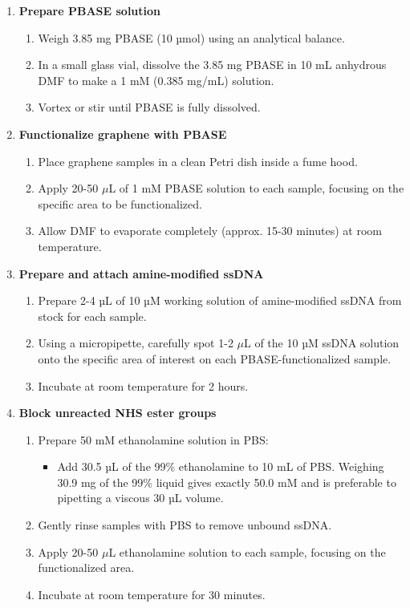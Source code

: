 \documentclass[11pt]{article}
\begin{document}
\begin{enumerate}
    \item \textbf{Prepare PBASE solution}
    \begin{enumerate}[label=(\alph*)]
        \item Weigh 3.85 mg PBASE (10 µmol) using an analytical balance.
        \item In a small glass vial, dissolve the 3.85 mg PBASE in 10 mL anhydrous DMF to make a 1 mM (0.385 mg/mL) solution.
        \item Vortex or stir until PBASE is fully dissolved.
    \end{enumerate}

    \item \textbf{Functionalize graphene with PBASE}
    \begin{enumerate}[label=(\alph*)]
        \item Place graphene samples in a clean Petri dish inside a fume hood.
        \item Apply 20-50 $\mu$L of 1 mM PBASE solution to each sample, focusing on the specific area to be functionalized.
        \item Allow DMF to evaporate completely (approx. 15-30 minutes) at room temperature.
    \end{enumerate}

    \item \textbf{Prepare and attach amine-modified ssDNA}
    \begin{enumerate}[label=(\alph*)]
        \item Prepare 2-4 µL of 10 µM working solution of amine-modified ssDNA from stock for each sample.
        \item Using a micropipette, carefully spot 1-2 $\mu$L of the 10 µM ssDNA solution onto the specific area of interest on each PBASE-functionalized sample.
        \item Incubate at room temperature for 2 hours.
    \end{enumerate}

    \item \textbf{Block unreacted NHS ester groups}
    \begin{enumerate}[label=(\alph*)]
        \item Prepare 50 mM ethanolamine solution in PBS:
        \begin{itemize}
            \item Add 30.5 µL of the 99\% ethanolamine to 10 mL of PBS. Weighing 30.9 mg of the 99\% liquid gives exactly 50.0 mM and is preferable to pipetting a viscous 30 µL volume.
        \end{itemize}
        \item Gently rinse samples with PBS to remove unbound ssDNA.
        \item Apply 20-50 $\mu$L ethanolamine solution to each sample, focusing on the functionalized area.
        \item Incubate at room temperature for 30 minutes.
    \end{enumerate}


\end{enumerate}
\end{document}
